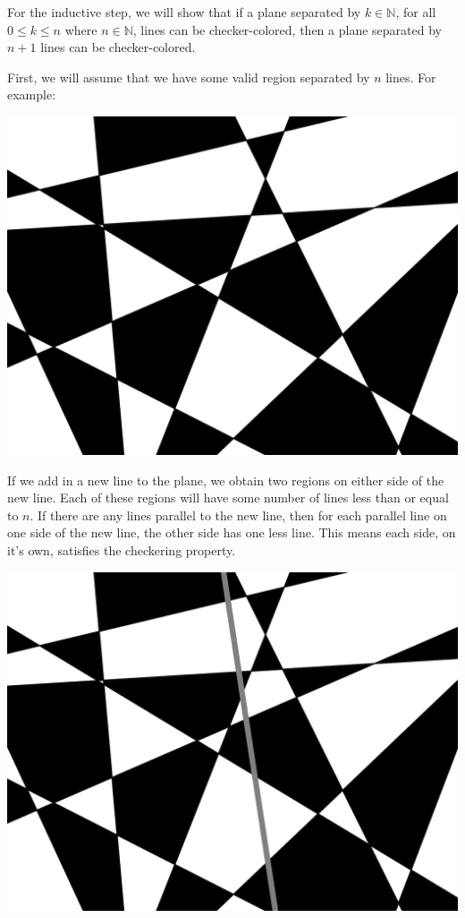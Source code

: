 \documentclass[12pt]{article}
\newcommand{\N}{\mathbb{N}}
\begin{document}
For the inductive step, we will show that if a plane separated by $k\in\N$, for all $0\leq k\leq n$ where $n\in\N$, lines can be checker-colored, then a plane separated by $n+1$ lines can be checker-colored.

First, we will assume that we have some valid region separated by $n$ lines. For example:
\begin{center}
    \includegraphics[scale=0.09]{amthgoodcjeckers.png}    
\end{center}

If we add in a new line to the plane, we obtain two regions on either side of the new line. Each of these regions will have some number of lines less than or equal to $n$. If there are any lines parallel to the new line, then for each parallel line on one side of the new line, the other side has one less line. This means each side, on it's own, satisfies the checkering property.
\begin{center}
    \includegraphics[scale=.09]{line.png}
\end{center}
\end{document}
